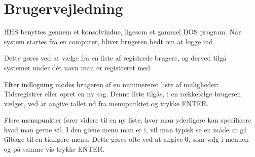 
\section{Brugervejledning}\label{brugervejledning}

HHS benyttes gennem et konsolvindue, ligesom et gammel DOS program.
Når system startes fra en computer, bliver brugeren bedt om at logge ind.

Dette gøres ved at vælge fra en liste af registrede brugere, og derved tilgå systemet under dét navn man er registreret med.

Efter indlogning mødes brugeren af en nummereret liste af muligheder: Tidsregistrer eller opret en ny sag.
Denne liste tilgås, i en rækkefølge brugeren vælger, ved at angive tallet ud fra menupunktet og trykke ENTER.

Flere menupunkter fører videre til en ny liste, hvor man yderligere kan specificere hvad man gerne vil.
I den givne menu man er i, vil man typisk se en måde at gå tilbage til en tidligere menu.
Dette gøres ofte ved at angive 0, som valg i menuen og på samme vis trykke ENTER.
